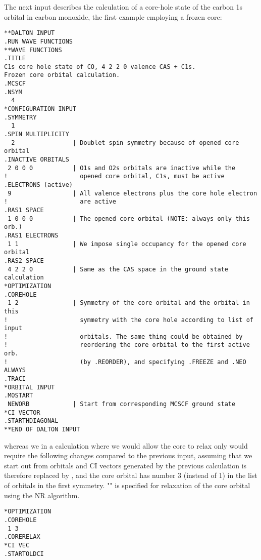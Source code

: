 The next input describes the calculation of a core-hole
state of the carbon 1s orbital in carbon monoxide, the first
example employing a frozen core:

\begin{verbatim}
**DALTON INPUT
.RUN WAVE FUNCTIONS
**WAVE FUNCTIONS
.TITLE
C1s core hole state of CO, 4 2 2 0 valence CAS + C1s.
Frozen core orbital calculation.
.MCSCF
.NSYM
  4
*CONFIGURATION INPUT
.SYMMETRY
  1
.SPIN MULTIPLICITY
  2                | Doublet spin symmetry because of opened core orbital
.INACTIVE ORBITALS
 2 0 0 0           | O1s and O2s orbitals are inactive while the
!                    opened core orbital, C1s, must be active
.ELECTRONS (active)
 9                 | All valence electrons plus the core hole electron
!                    are active
.RAS1 SPACE
 1 0 0 0           | The opened core orbital (NOTE: always only this orb.)
.RAS1 ELECTRONS
 1 1               | We impose single occupancy for the opened core orbital
.RAS2 SPACE
 4 2 2 0           | Same as the CAS space in the ground state calculation
*OPTIMIZATION
.COREHOLE
 1 2               | Symmetry of the core orbital and the orbital in this
!                    symmetry with the core hole according to list of input
!                    orbitals. The same thing could be obtained by
!                    reordering the core orbital to the first active orb.
!                    (by .REORDER), and specifying .FREEZE and .NEO ALWAYS
.TRACI
*ORBITAL INPUT
.MOSTART
 NEWORB            | Start from corresponding MCSCF ground state
*CI VECTOR
.STARTHDIAGONAL
**END OF DALTON INPUT
\end{verbatim}
\label{sirius_ex6}


whereas we in a calculation where we would allow the core to
relax only would require the following changes
compared to the previous input, assuming that we start out from
orbitals and CI vectors generated by the previous calculation
 is therefore replaced by , and
the core orbital has number 3 (instead of 1) in the list of
orbitals in the first symmetry. "" is specified for
relaxation of the core orbital using the NR algorithm.

\begin{verbatim}
*OPTIMIZATION
.COREHOLE
 1 3
.CORERELAX
*CI VEC
.STARTOLDCI
\end{verbatim}
\label{sirius_ex7}

